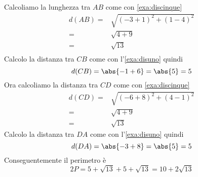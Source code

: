 	Calcoliamo la lunghezza tra $AB$ come con \cref{exa:discinque}
	\begin{align*}
		d(AB)=&\sqrt{(-3+1)^2+(1-4)^2}\\
		=&\sqrt{4+9}\\
		=&\sqrt{13}\\
	\end{align*}
	Calcolo la distanza tra $CB$ come con l'\cref{exa:disuno}
	quindi \[d(CB)=\abs{-1+6}=\abs{5}=5\]
	Ora calcoliamo la distanza tra $CD$ come con \cref{exa:discinque}
	\begin{align*}
		d(CD)=&\sqrt{(-6+8)^2+(4-1)^2}\\
			=&\sqrt{4+9}\\
		=&\sqrt{13}
	\end{align*}
	Calcolo la distanza tra $DA$ come con l'\cref{exa:disuno}
	quindi \[d(DA)=\abs{-3+8}=\abs{5}=5\]
	Conseguentemente il perimetro è
	\[2P=5+\sqrt{13}+5+\sqrt{13}=10+2\sqrt{13}\]
	\begin{center}
		
		\label{fig:EsRieDistanza12}
	\end{center}
